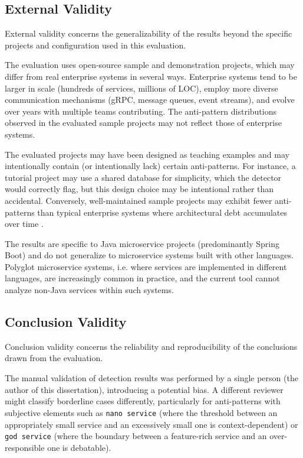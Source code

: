 \subsection{External Validity}
\label{subsec:external-validity}

\par External validity concerns the generalizability of the results beyond the specific projects and configuration used in this evaluation.

\par The evaluation uses open-source sample and demonstration projects, which may differ from real enterprise systems in several ways. Enterprise systems tend to be larger in scale (hundreds of services, millions of LOC), employ more diverse communication mechanisms (gRPC, message queues, event streams), and evolve over years with multiple teams contributing. The anti-pattern distributions observed in the evaluated sample projects may not reflect those of enterprise systems.

\par The evaluated projects may have been designed as teaching examples and may intentionally contain (or intentionally lack) certain anti-patterns. For instance, a tutorial project may use a shared database for simplicity, which the detector would correctly flag, but this design choice may be intentional rather than accidental. Conversely, well-maintained sample projects may exhibit fewer anti-patterns than typical enterprise systems where architectural debt accumulates over time \cite{Taibi2018}.

\par The results are specific to Java microservice projects (predominantly Spring Boot) and do not generalize to microservice systems built with other languages. Polyglot microservice systems, i.e. where services are implemented in different languages, are increasingly common in practice, and the current tool cannot analyze non-Java services within such systems.

\subsection{Conclusion Validity}
\label{subsec:conclusion-validity}

\par Conclusion validity concerns the reliability and reproducibility of the conclusions drawn from the evaluation.

\par The manual validation of detection results was performed by a single person (the author of this dissertation), introducing a potential bias. A different reviewer might classify borderline cases differently, particularly for anti-patterns with subjective elements such as \texttt{nano service} (where the threshold between an appropriately small service and an excessively small one is context-dependent) or \texttt{god service} (where the boundary between a feature-rich service and an over-responsible one is debatable).

